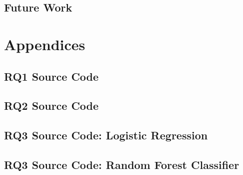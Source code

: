 \documentclass[12pt,bibliography=totocnumbered]{scrartcl}
\begin{document}
\subsection{Future Work}
\printbibliography

\section{Appendices}

\subsection{RQ1 Source Code}\label{appendix:srca}

\subsection{RQ2 Source Code}\label{appendix:srcb}

\subsection{RQ3 Source Code: Logistic Regression}\label{appendix:src1}

\subsection{RQ3 Source Code: Random Forest Classifier}\label{appendix:src2}
\end{document}
